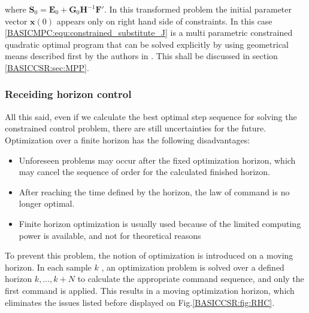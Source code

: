     where $\textbf{S}_0=\textbf{E}_0+\textbf{G}_0\textbf{H}^{-1}\textbf{F}'$. In this transformed problem the initial parameter vector $\textbf{x}(0)$ appears only on right hand side of constraints. In this case \ref{BASICMPC:equ:constrained_substitute_J} is a multi parametric constrained quadratic optimal program that can be solved explicitly by using geometrical means described first by the authors in \cite{bemporad2002explicit}. This shall be discussed in section \ref{BASICCSR:sec:MPP}.

\subsubsection{Receiding horizon control}\label{BASICCSR:sec:RHC}

    All this said, even if we calculate the best optimal step sequence for solving the constrained control problem, there are still uncertainties for the future. Optimization over a finite horizon has the following disadvantages:
		
		\begin{itemize}
			\item Unforeseen problems may occur after the fixed optimization horizon, which may cancel the sequence of order for the 		calculated finished horizon.
		\item After reaching the time defined by the horizon, the law of command is no longer optimal.
		\item Finite horizon optimization is usually used because of the limited computing power is available, and not for theoretical reasons
		\end{itemize}
		
		To prevent this problem, the notion of optimization is introduced on a moving horizon. In each sample $k$ , an optimization problem is solved over a defined horizon $k,\dots,k+N$ to calculate the appropriate command sequence, and only the first command is applied. This results in a moving optimization horizon, which eliminates the issues listed before displayed on Fig.\ref{BASICCSR:fig:RHC}. \\

